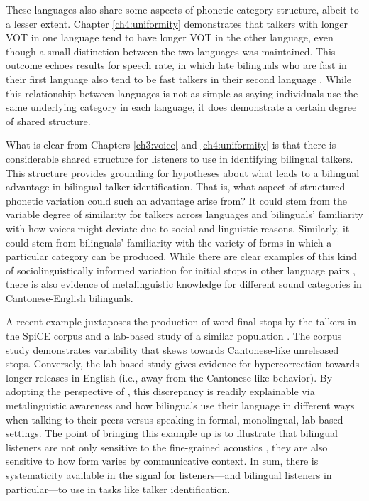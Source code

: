 These languages also share some aspects of phonetic category structure, albeit to a lesser extent. Chapter \ref{ch4:uniformity} demonstrates that talkers with longer VOT in one language tend to have longer VOT in the other language, even though a small distinction between the two languages was maintained. This outcome echoes results for speech rate, in which late bilinguals who are fast in their first language also tend to be fast talkers in their second language \citep{bradlow_2017_rate}. While this relationship between languages is not as simple as saying individuals use the same underlying category in each language, it does demonstrate a certain degree of shared structure.

What is clear from Chapters \ref{ch3:voice} and \ref{ch4:uniformity} is that there is considerable shared structure for listeners to use in identifying bilingual talkers. This structure provides grounding for hypotheses about what leads to a bilingual advantage in bilingual talker identification. That is, what aspect of structured phonetic variation could such an advantage arise from? It could stem from the variable degree of similarity for talkers across languages and bilinguals' familiarity with how voices might deviate due to social and linguistic reasons. Similarly, it could stem from bilinguals' familiarity with the variety of forms in which a particular category can be produced. While there are clear examples of this kind of sociolinguistically informed variation for initial stops in other language pairs \citep{bullock_2009_sociophonetics}, there is also evidence of metalinguistic knowledge for different sound categories in Cantonese-English bilinguals. 

A recent example juxtaposes the production of word-final stops by the talkers in the SpiCE corpus \citep{johnson_2021_language} and a lab-based study of a similar population \citep{polinsky_2018_heritage}. The corpus study demonstrates variability that skews towards Cantonese-like unreleased stops. Conversely, the lab-based study gives evidence for hypercorrection towards longer releases in English (i.e., away from the Cantonese-like behavior). By adopting the perspective of \citet{bullock_2009_sociophonetics}, this discrepancy is readily explainable via metalinguistic awareness and how bilinguals use their language in different ways when talking to their peers versus speaking in formal, monolingual, lab-based settings. The point of bringing this example up is to illustrate that bilingual listeners are not only sensitive to the fine-grained acoustics \citep{ju_2004_falling}, they are also sensitive to how form varies by communicative context. In sum, there is systematicity available in the signal for listeners---and bilingual listeners in particular---to use in tasks like talker identification. 

